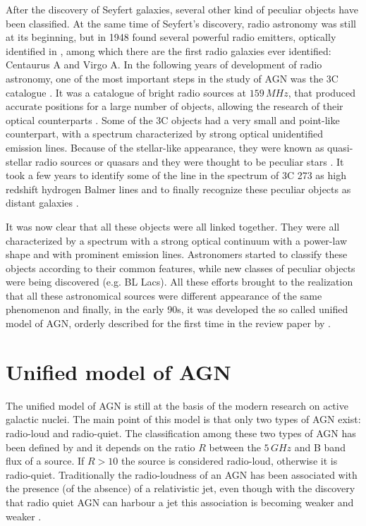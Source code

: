 \documentclass[../main.tex]{subfiles}
\begin{document}
After the discovery of Seyfert galaxies, several other kind of peculiar objects have been classified. 
At the same time of Seyfert's discovery, radio astronomy was still at its beginning, but in 1948 \citet{Bolton48} found several powerful radio emitters, optically identified in \citet{Bolton49}, among which there are the first radio galaxies ever identified: Centaurus A and Virgo A.
In the following years of development of radio astronomy, one of the most important steps in the study of AGN was the 3C catalogue \citep{Edge59}.
It was a catalogue of bright radio sources at $159\,\si{MHz}$, that produced accurate positions for a large number of objects, allowing the research of their optical counterparts \citep{Shields99}.
Some of the 3C objects had a very small and point-like counterpart, with a spectrum characterized by strong optical unidentified emission lines.
Because of the stellar-like appearance, they were known as quasi-stellar radio sources or quasars and they were thought to be peculiar stars \citep{Shields99}.
It took a few years to identify some of the line in the spectrum of 3C 273 as high redshift hydrogen Balmer lines and to finally recognize these peculiar objects as distant galaxies \citep{Schmidt63}.

It was now clear that all these objects were all linked together.
They were all characterized by a spectrum with a strong optical continuum with a power-law shape and with prominent emission lines.
Astronomers started to classify these objects according to their common features, while new classes of peculiar objects were being discovered (e.g. BL Lacs).
All these efforts brought to the realization that all these astronomical sources were different appearance of the same phenomenon and finally, in the early 90s, it was developed the so called unified model of AGN, orderly described for the first time in the review paper by \citet{Antonucci93}.


\section{Unified model of AGN}
\label{sec:unified_model}

The unified model of AGN \citep{Antonucci93} is still at the basis of the modern research on active galactic nuclei.
The main point of this model is that only two types of AGN exist: radio-loud and radio-quiet.
The classification among these two types of AGN has been defined by \citet{Kellermann89} and it depends on the ratio $R$ between the $5\,\si{GHz}$ and B band flux of a source.
If $R>10$ the source is considered radio-loud, otherwise it is radio-quiet.
Traditionally the radio-loudness of an AGN has been associated with the presence (of the absence) of a relativistic jet, even though with the discovery that radio quiet AGN can harbour a jet \citep[e.g.][]{Blundell03} this association is becoming weaker and weaker \citep{Padovani17,Foschini17}.
\end{document}
